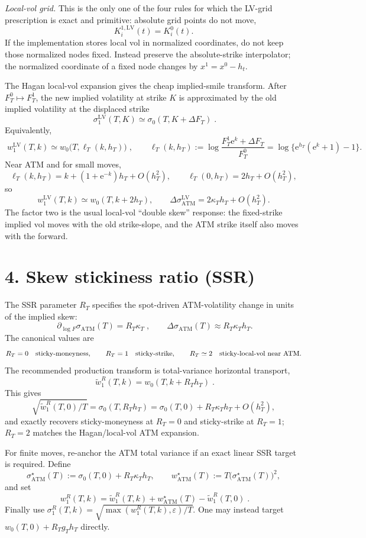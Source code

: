 \documentclass[8pt]{extarticle}
\newcommand{\sig}{\sigma}
\newcommand{\w}{w}
\newcommand{\ATM}{\mathrm{ATM}}
\newcommand{\LV}{\mathrm{LV}}
\newcommand{\e}{\mathrm{e}}
\newcommand{\eps}{\varepsilon}
\begin{document}
\textit{Local-vol grid.} This is the only one of the four rules for which the LV-grid prescription is exact and primitive: absolute grid points do not move,
\[
        K_i^{1,\LV}(t)=K_i^0(t).
\]
If the implementation stores local vol in normalized coordinates, do not keep those normalized nodes fixed. Instead preserve the absolute-strike interpolator; the normalized coordinate of a fixed node changes by $x^1=x^0-h_t$.

The Hagan local-vol expansion gives the cheap implied-smile transform. After $F_T^0\mapsto F_T^1$, the new implied volatility at strike $K$ is approximated by the old implied volatility at the displaced strike
\[
        \boxed{\;\sig_1^{\LV}(T,K)\simeq \sig_0(T,K+\Delta F_T)\;} .
\]
Equivalently,
\[
        \boxed{\;\w_1^{\LV}(T,k)\simeq
        \w_0\bigl(T,\ell_T(k,h_T)\bigr)\;},
        \qquad
        \ell_T(k,h_T):=\log\frac{F_T^1\e^k+\Delta F_T}{F_T^0}
        =\log\{\e^{h_T}(\e^k+1)-1\}.
\]
Near ATM and for small moves,
\[
        \ell_T(k,h_T)=k+(1+\e^{-k})h_T+O(h_T^2),
        \qquad
        \ell_T(0,h_T)=2h_T+O(h_T^2),
\]
so
\[
        \w_1^{\LV}(T,k)\simeq \w_0(T,k+2h_T),
        \qquad
        \Delta\sig_{\ATM}^{\LV}=2\kappa_T h_T+O(h_T^2).
\]
The factor two is the usual local-vol ``double skew'' response: the fixed-strike implied vol moves with the old strike-slope, and the ATM strike itself also moves with the forward.

\section*{4. Skew stickiness ratio (SSR)}
The SSR parameter $R_T$ specifies the spot-driven ATM-volatility change in units of the implied skew:
\[
        \boxed{\;\partial_{\log F}\sig_{\ATM}(T)=R_T\kappa_T\;},
        \qquad
        \Delta\sig_{\ATM}(T)\approx R_T\kappa_T h_T .
\]
The canonical values are
\[
        R_T=0 \quad\hbox{sticky-moneyness},\qquad
        R_T=1 \quad\hbox{sticky-strike},\qquad
        R_T\simeq 2 \quad\hbox{sticky-local-vol near ATM}.
\]
The recommended production transform is total-variance horizontal transport,
\[
        \boxed{\;\widetilde\w_1^R(T,k)=\w_0(T,k+R_T h_T)\;} .
\]
This gives
\[
        \sqrt{\widetilde\w_1^R(T,0)/T}
        =\sig_0(T,R_T h_T)
        =\sig_0(T,0)+R_T\kappa_T h_T+O(h_T^2),
\]
and exactly recovers sticky-moneyness at $R_T=0$ and sticky-strike at $R_T=1$; $R_T=2$ matches the Hagan/local-vol ATM expansion.

For finite moves, re-anchor the ATM total variance if an exact linear SSR target is required. Define
\[
        \sig_{\ATM}^{\star}(T):=\sig_0(T,0)+R_T\kappa_T h_T,
        \qquad
        \w_{\ATM}^{\star}(T):=T\bigl(\sig_{\ATM}^{\star}(T)\bigr)^2,
\]
and set
\[
        \boxed{\;\w_1^R(T,k)=\widetilde\w_1^R(T,k)
        +\w_{\ATM}^{\star}(T)-\widetilde\w_1^R(T,0)\;} .
\]
Finally use $\sig_1^R(T,k)=\sqrt{\max(\w_1^R(T,k),\eps)/T}$. One may instead target $\w_0(T,0)+R_Tg_T h_T$ directly.
\end{document}
